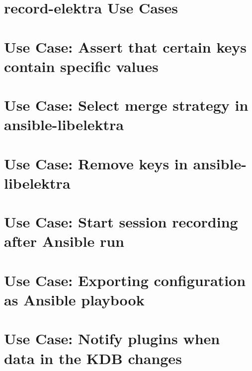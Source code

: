 \let\mypdfximage\pdfximage\def\pdfximage{\immediate\mypdfximage}\documentclass[twoside]{book}
\newcommand{\+}{\discretionary{\mbox{\scriptsize$\hookleftarrow$}}{}{}}
\begin{document}
\chapter{record-\/elektra Use Cases}
\label{doc_usecases_record_elektra_README_md}

\chapter{Use Case\+: Assert that certain keys contain specific values}
\label{doc_usecases_record_elektra_UC_ansible-libelektra_assert_keys_md}

\chapter{Use Case\+: Select merge strategy in ansible-\/libelektra}
\label{doc_usecases_record_elektra_UC_ansible-libelektra_merge_strategies_md}

\chapter{Use Case\+: Remove keys in ansible-\/libelektra}
\label{doc_usecases_record_elektra_UC_ansible-libelektra_remove_keys_md}

\chapter{Use Case\+: Start session recording after Ansible run}
\label{doc_usecases_record_elektra_UC_ansible-libelektra_start_recording_md}

\chapter{Use Case\+: Exporting configuration as Ansible playbook}
\label{doc_usecases_record_elektra_UC_ansible_export_md}

\chapter{Use Case\+: Notify plugins when data in the KDB changes}
\label{doc_usecases_record_elektra_UC_change_notifications_md}

\end{document}
